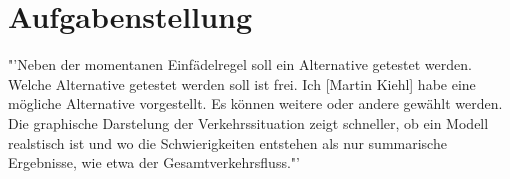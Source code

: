 \chapter{Aufgabenstellung}
"'Neben der momentanen Einfädelregel soll ein Alternative getestet werden. Welche Alternative getestet werden soll ist frei. Ich [Martin Kiehl] habe eine mögliche Alternative vorgestellt. Es können weitere oder andere gewählt werden. Die graphische Darstelung der Verkehrssituation zeigt schneller, ob ein Modell realstisch ist und wo die Schwierigkeiten entstehen als nur summarische Ergebnisse, wie etwa der Gesamtverkehrsfluss."'